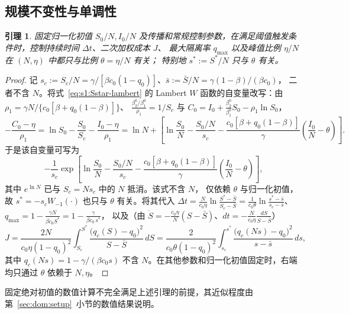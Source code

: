 \documentclass[UTF8,a4paper,10pt,fontset=fandol]{ctexart}
\theoremstyle{cnplain}
\newtheorem{lemma}[theorem]{引理}
\theoremstyle{remark}
\numberwithin{equation}{section}
\begin{document}
\subsection{规模不变性与单调性}
\label{sec:dom:theory}

\begin{lemma}\label{lem:dom:scaling}
固定归一化初值 $S_0/N,I_0/N$ 及传播和常规控制参数，在满足阈值触发条件时，控制持续时间 $\Delta t$、二次加权成本 $J$、
最大隔离率 $q_{\max}$ 以及峰值比例 $\eta/N$ 在 $(N,\eta)$ 中都只与比例 $\theta=\eta/N$ 有关；
特别地 $s^*:=S^\ast/N$ 只与 $\theta$ 有关。
\end{lemma}
\begin{proof}
记 $s_c:=S_c/N=\gamma/[\beta c_0(1-q_0)]$、$\bar s:=\bar S/N=\gamma(1-\beta)/(\beta c_0)$，
二者不含 $N$。将式~\eqref{eq:s1:Sstar-lambert} 的 Lambert $W$ 函数的自变量改写：由
$\rho_1=\gamma N/\{c_0[\beta+q_0(1-\beta)]\}$、
$\frac{\beta_2^0/\beta_1^0}{\rho_1}=1/S_c$ 与
$C_0=I_0+\tfrac{\beta_2^0}{\beta_1^0}S_0-\rho_1\ln S_0$，
\[
  -\frac{C_0-\eta}{\rho_1}
  = \ln S_0-\frac{S_0}{S_c}-\frac{I_0-\eta}{\rho_1}
  = \ln N+\left[
  \ln\frac{S_0}{N}-\frac{S_0/N}{s_c}
  -\frac{c_0[\beta+q_0(1-\beta)]}{\gamma}
  \left(\frac{I_0}{N}-\theta\right)
  \right].
\]
于是该自变量可写为
\[
-\frac{1}{s_c}
\exp\left[
\ln\frac{S_0}{N}-\frac{S_0/N}{s_c}
-\frac{c_0[\beta+q_0(1-\beta)]}{\gamma}
\left(\frac{I_0}{N}-\theta\right)
\right],
\]
其中 $e^{\ln N}$ 已与 $S_c=Ns_c$ 中的 $N$ 抵消。该式不含 $N$，
仅依赖 $\theta$ 与归一化初值，故
$s^*=-s_c W_{-1}(\cdot)$ 也只与 $\theta$ 有关。将其代入
$\Delta t=\frac{N}{c_0\eta}\ln\frac{S^\ast-\bar S}{S_c-\bar S}
 =\frac{1}{c_0\theta}\ln\frac{s^*-\bar s}{s_c-\bar s}$、
$q_{\max}=1-\frac{\gamma N}{\beta c_0 S^\ast}=1-\frac{\gamma}{\beta c_0\,s^*}$，
以及（由 $\dot S=-\frac{c_0\eta}{N}(S-\bar S)$、$dt=-\frac{N}{c_0\eta}\frac{dS}{S-\bar S}$）
\begin{equation}
  J=\frac{2N}{c_0\eta(1-q_0)^2}\int_{S_c}^{S^\ast}\frac{\big(q_c(S)-q_0\big)^2}{S-\bar S}\,dS
   =\frac{2}{c_0\theta(1-q_0)^2}\int_{s_c}^{s^*}\frac{\big(q_c(N s)-q_0\big)^2}{s-\bar s}\,ds,
  \label{eq:dom:Jtheta}
\end{equation}
其中 $q_c(N s)=1-\gamma/(\beta c_0 s)$ 不含 $N$。在其他参数和归一化初值固定时，右端均只通过 $\theta$ 依赖于 $N,\eta$。
\end{proof}

固定绝对初值的数值计算不完全满足上述引理的前提，其近似程度由第~\ref{sec:dom:setup}~小节的数值结果说明。
\end{document}
